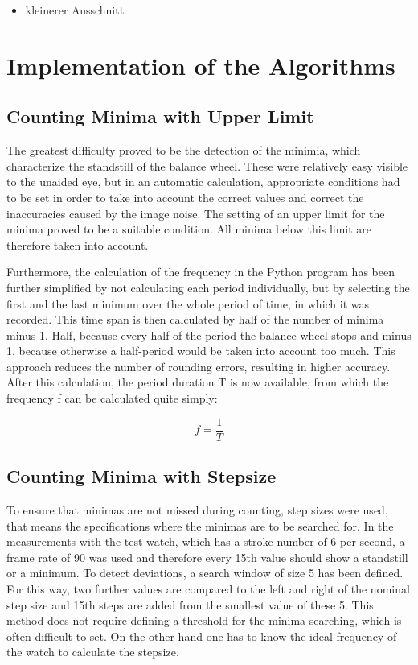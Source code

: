 \documentclass[12pt, a4paper]{report}
\begin{document}
        \begin{itemize}
    \item kleinerer Ausschnitt
    \end{itemize}
    
       \section{Implementation of the Algorithms}
    \subsection{Counting Minima with Upper Limit} 
    
    The greatest difficulty proved to be the detection of the minimia, which characterize the standstill of the balance wheel. These were relatively easy visible to the unaided eye, but in an automatic calculation, appropriate conditions had to be set in order to take into account the correct values and correct the inaccuracies caused by the image noise. The setting of an upper limit for the minima proved to be a suitable condition. All minima below this limit are therefore taken into account. 
    
    Furthermore, the calculation of the frequency in the Python program has been further simplified by not calculating each period individually, but by selecting the first and the last minimum over the whole period of time, in which it was recorded. This time span is then calculated by half of the number of minima minus 1. Half, because every half of the period the balance wheel stops and minus 1, because otherwise a half-period would be taken into account too much. This approach reduces the number of rounding errors, resulting in higher accuracy. After this calculation, the period duration T is now available, from which the frequency f can be calculated quite simply: 
    
     \begin{displaymath}
      f = \frac{1}{T}
     \end{displaymath}
     
  \subsection{Counting Minima with Stepsize}
  To ensure that minimas are not missed during counting, step sizes were used, that means the specifications where the minimas are to be searched for. In the measurements with the test watch, which has a stroke number of 6 per second, a frame rate of 90 was used and therefore every 15th value should show a standstill or a minimum. To detect deviations, a search window of size 5 has been defined.
  For this way, two further values are compared to the left and right of the nominal step size and 15th steps are added from the smallest value of these 5. This method does not require defining a threshold for the minima searching, which is often difficult to set. On the other hand one has to know the ideal frequency of the watch to calculate the stepsize.
  
\end{document}
